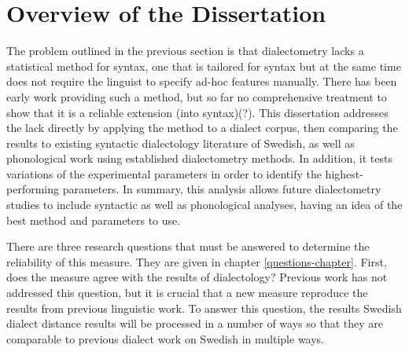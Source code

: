 


\section{Overview of the Dissertation}

The problem outlined in the previous section is that dialectometry
lacks a statistical method for syntax, one that is tailored for syntax
but at the same time does not require the linguist to specify ad-hoc
features manually. There has been early work providing such a method,
but so far no comprehensive treatment to show that it is a reliable
extension (into syntax)(?). This dissertation addresses the lack
directly by applying the method to a dialect corpus, then comparing
the results to existing syntactic dialectology literature of Swedish,
as well as phonological work using established dialectometry
methods. In addition, it tests variations of the experimental
parameters in order to identify the highest-performing parameters. In
summary, this analysis allows future dialectometry studies to include
syntactic as well as phonological analyses, having an idea of the best
method and parameters to use.

There are three research questions that must be answered to determine
the reliability of this measure. They are given in chapter
\ref{questions-chapter}. First, does the measure agree with the
results of dialectology? Previous work has not addressed this
question, but it is crucial that a new measure reproduce the results
from previous linguistic work. To answer this question, the results
Swedish dialect distance results will be processed in a number of ways
so that they are comparable to previous dialect work on Swedish in
multiple ways.

